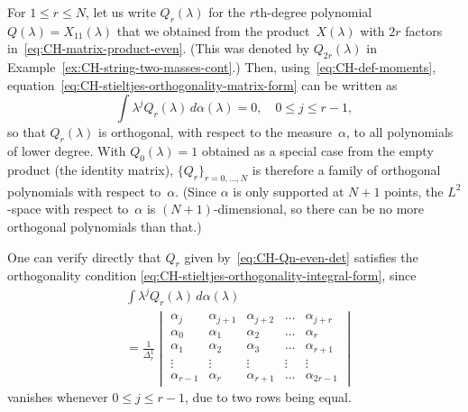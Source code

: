 \documentclass[10pt,a4paper]{article} \pdfoutput=1 
\begin{document}
\begin{remark}
  \label{rem:CH-orthpoly}
  For $1 \le r \le N$, let us write $Q_r(\lambda)$
  for the $r$th-degree
  polynomial $Q(\lambda) = X_{11}(\lambda)$
  that we obtained from the product~$X(\lambda)$ with $2r$ factors
  in~\eqref{eq:CH-matrix-product-even}.
  (This was denoted by $Q_{2r}(\lambda)$ in Example~\ref{ex:CH-string-two-masses-cont}.)
  Then, using~\eqref{eq:CH-def-moments},
  equation~\eqref{eq:CH-stieltjes-orthogonality-matrix-form}
  can be written as
  \begin{equation}
    \label{eq:CH-stieltjes-orthogonality-integral-form}
    \int \lambda^j Q_{r}(\lambda) \, d\alpha(\lambda) = 0
    ,\quad
    0 \le j \le r-1
    ,
  \end{equation}
  so that $Q_{r}(\lambda)$ is orthogonal, with respect to the measure~$\alpha$,
  to all polynomials of lower degree.
  With $Q_0(\lambda)=1$ obtained as a special case from the empty product (the identity matrix),
  $\{ Q_{r} \}_{r=0,\dots,N}$ is therefore a family of orthogonal polynomials
  with respect to~$\alpha$.
  (Since $\alpha$ is only supported at $N+1$ points, the $L^2$-space with respect to~$\alpha$
  is $(N+1)$-dimensional, so there can be no more orthogonal polynomials than that.)

  One can verify directly that $Q_{r}$ given by~\eqref{eq:CH-Qn-even-det}
  satisfies the orthogonality condition \eqref{eq:CH-stieltjes-orthogonality-integral-form}, since
  \begin{equation*}
    \begin{split}
      &
      \int \lambda^j Q_{r}(\lambda) \, d\alpha(\lambda)
      \\ &
      =
      \frac{1}{\Delta_r^1}
      \begin{vmatrix}
        \alpha_j & \alpha_{j+1} & \alpha_{j+2} & \dots & \alpha_{j+r}\\
        \alpha_0 & \alpha_1 & \alpha_2 & \dots & \alpha_r \\
        \alpha_1 & \alpha_2 & \alpha_3 & \dots & \alpha_{r+1} \\
        \vdots & \vdots & \vdots & \vdots & \vdots \\
        \alpha_{r-1} & \alpha_r & \alpha_{r+1} & \dots & \alpha_{2r-1}
      \end{vmatrix}
    \end{split}
  \end{equation*}
  vanishes whenever $0 \le j \le r-1$, due to two rows being equal.
\end{remark}
\end{document}
